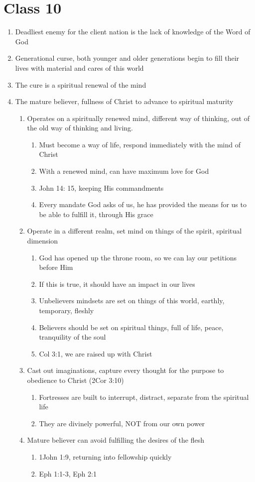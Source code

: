 \documentclass[11pt]{article}
\begin{document}
\section*{Class 10}
\begin{enumerate}
	\item Deadliest enemy for the client nation is the lack of knowledge of the Word of God
	\item Generational curse, both younger and older generations begin to fill their lives with material and cares of this world
	\item The cure is a spiritual renewal of the mind
	\item The mature believer, fullness of Christ to advance to spiritual maturity
	\begin{enumerate}
		\item Operates on a spiritually renewed mind, different way of thinking, out of the old way of thinking and living.
		\begin{enumerate}
			\item Must become a way of life, respond immediately with the mind of Christ
			\item With a renewed mind, can have maximum love for God
			\item John 14: 15, keeping His commandments
			\item Every mandate God asks of us, he has provided the means for us to be able to fulfill it, through His grace
		\end{enumerate}
		\item Operate in a different realm, set mind on things of the spirit, spiritual dimension
		\begin{enumerate}
			\item God has opened up the throne room, so we can lay our petitions before Him
			\item If this is true, it should have an impact in our lives
			\item Unbelievers mindsets are set on things of this world, earthly, temporary, fleshly
			\item Believers should be set on spiritual things, full of life, peace, tranquility of the soul
			\item Col 3:1, we are raised up with Christ
		\end{enumerate}
		\item Cast out imaginations, capture every thought for the purpose to obedience to Christ (2Cor 3:10)
		\begin{enumerate}
			\item Fortresses are built to interrupt, distract, separate from the spiritual life
			\item They are divinely powerful, NOT from our own power
		\end{enumerate}
		\item Mature believer can avoid fulfilling the desires of the flesh
		\begin{enumerate}
			\item 1John 1:9, returning into fellowship quickly
			\item Eph 1:1-3, Eph 2:1
		\end{enumerate}
		

\end{enumerate}
\end{enumerate}
\end{document}
